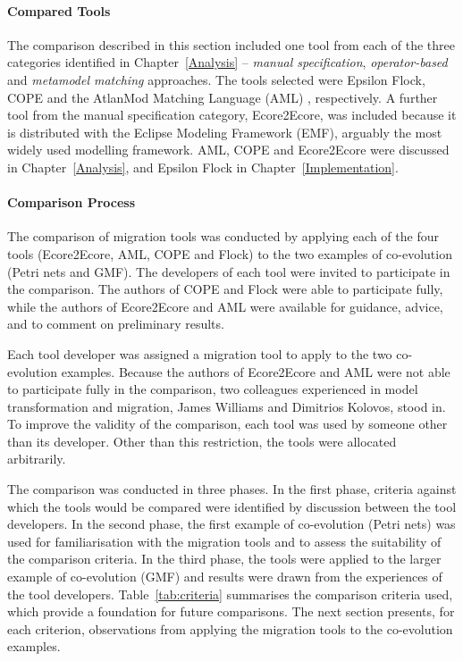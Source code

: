 \paragraph{Compared Tools}
\label{subsec:method_tools}
The comparison described in this section included one tool from each of the three categories identified in Chapter~\ref{Analysis} -- \emph{manual specification}, \emph{operator-based} and \emph{metamodel matching} approaches. The tools selected were Epsilon Flock, COPE \cite{herrmannsdoerfer09cope} and the AtlanMod Matching Language (AML) \cite{garces09managing}, respectively. A further tool from the manual specification category, Ecore2Ecore, was included because it is distributed with the Eclipse Modeling Framework (EMF), arguably the most widely used modelling framework. AML, COPE and Ecore2Ecore were discussed in Chapter~\ref{Analysis}, and Epsilon Flock in Chapter~\ref{Implementation}.


\paragraph{Comparison Process}
\label{subsec:method_process}
The comparison of migration tools was conducted by applying each of the four tools (Ecore2Ecore, AML, COPE and Flock) to the two examples of co-evolution (Petri nets and GMF). The developers of each tool were invited to participate in the comparison. The authors of COPE and Flock were able to participate fully, while the authors of Ecore2Ecore and AML were available for guidance, advice, and to comment on preliminary results.

Each tool developer was assigned a migration tool to apply to the two co-evolution examples. Because the authors of Ecore2Ecore and AML were not able to participate fully in the comparison, two colleagues experienced in model transformation and migration, James Williams and Dimitrios Kolovos, stood in. To improve the validity of the comparison, each tool was used by someone other than its developer. Other than this restriction, the tools were allocated arbitrarily.

The comparison was conducted in three phases. In the first phase, criteria against which the tools would be compared were identified by discussion between the tool developers. In the second phase, the first example of co-evolution (Petri nets) was used for familiarisation with the migration tools and to assess the suitability of the comparison criteria. In the third phase, the tools were applied to the larger example of co-evolution (GMF) and results were drawn from the experiences of the tool developers. Table~\ref{tab:criteria} summarises the comparison criteria used, which provide a foundation for future comparisons. The next section presents, for each criterion, observations from applying the migration tools to the co-evolution examples.


